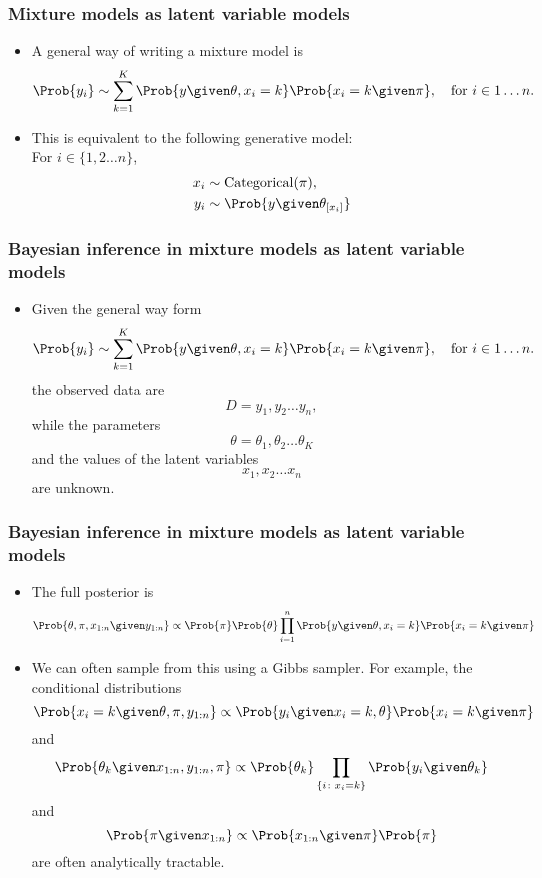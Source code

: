 \documentclass{slides}
\begin{document}
	\begin{frame}
	\frametitle{Mixture models as latent variable models}
	\begin{itemize}
	\item A general way of writing a mixture model is 
		\[
			\Prob{y_i} \sim \sum_{k=1}^K \Prob{y \given \theta, x_i=k}\Prob{x_i=k\given\pi}, \quad\text{for $i \in {1 \ldots n}$.}
		\]
	\item This is equivalent to the following generative model: \\
		For $i \in \{1, 2 \ldots n\}$,
		\begin{align*}
			x_i &\sim \mathrm{Categorical}(\pi),\\
			y_i &\sim \Prob{y\given \theta_{[x_i]}}
		\end{align*}
	\end{itemize}
	\end{frame}


	\begin{frame}
	\frametitle{Bayesian inference in mixture models as latent variable models}
	\begin{itemize}
	\item Given the general way form
		\[
			\Prob{y_i} \sim \sum_{k=1}^K \Prob{y \given \theta, x_i=k}\Prob{x_i=k\given\pi}, \quad\text{for $i \in {1 \ldots n}$.}
		\]
		the observed data are\[ D = y_1, y_2 \ldots y_n,\] 
		while the parameters 
		\[\theta = \theta_1, \theta_2 \ldots \theta_K\]
		and the values of the latent variables \[x_1, x_2 \ldots x_n\] are unknown.
	\end{itemize}
	\end{frame}


	\begin{frame}
	\frametitle{Bayesian inference in mixture models as latent variable models}
	\begin{itemize}
		\item The full posterior is \[
		\Prob{\theta, \pi, x_{1:n} \given y_{1:n}} \propto \Prob{\pi}\Prob{\theta}\prod_{i=1}^n \Prob{y \given \theta, x_i=k}\Prob{x_i=k\given\pi}
		\]
	\item We can often sample from this using a Gibbs sampler. For example, the conditional distributions 
		\[
			\Prob{x_i = k \given \theta, \pi, y_{1:n}} \propto 
			\Prob{y_i \given x_i=k, \theta}\Prob{x_i = k \given \pi}
		\]
		and \[
			\Prob{\theta_k \given x_{1:n}, y_{1:n}, \pi} \propto \Prob{\theta_k} \prod_{\{i \colon x_i=k\}}\Prob{y_i \given \theta_k}
		\]
		and \[
			\Prob{\pi\given x_{1:n}} \propto \Prob{x_{1:n}\given \pi}\Prob{\pi}
		\]
		are often analytically tractable.
	\end{itemize}
	\end{frame}
\end{document}
